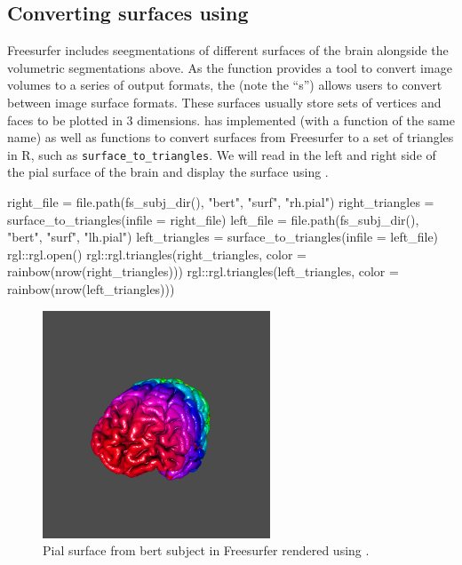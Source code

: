 \subsection{\texorpdfstring{Converting surfaces using
}{Converting surfaces using }}\label{converting-surfaces-using}

Freesurfer includes seegmentations of different surfaces of the brain
alongside the volumetric segmentations above. As the 
function provides a tool to convert image volumes to a series of output
formats, the  (note the ``s'') allows users to
convert between image surface formats. These surfaces usually store sets
of vertices and faces to be plotted in 3 dimensions. 
has implemented  (with a function of the same name)
as well as functions to convert surfaces from Freesurfer to a set of
triangles in R, such as \texttt{surface\_to\_triangles}. We will read in
the left and right side of the pial surface of the brain and display the
surface using  \citep{rgl}.

\begin{Schunk}
\begin{Sinput}
right_file = file.path(fs_subj_dir(), 
                   "bert", "surf", "rh.pial")
right_triangles = surface_to_triangles(infile = right_file)
left_file = file.path(fs_subj_dir(), 
                   "bert", "surf", "lh.pial")
left_triangles = surface_to_triangles(infile = left_file) 
rgl::rgl.open()
rgl::rgl.triangles(right_triangles, 
                   color = rainbow(nrow(right_triangles)))
rgl::rgl.triangles(left_triangles, 
                   color = rainbow(nrow(left_triangles)))
\end{Sinput}
\end{Schunk}

\begin{figure}
\centering
\includegraphics{Freesurfer_files/figure-latex/rgl_plot_out.png}
\caption{Pial surface from bert subject in Freesurfer rendered using
.}
\end{figure}

